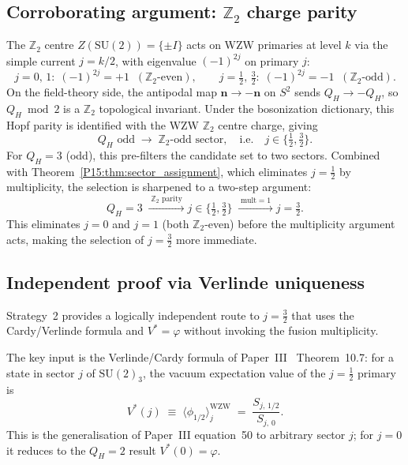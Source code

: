 \documentclass[11pt,a4paper]{article}
\theoremstyle{definition}\newtheorem{definition}[theorem]{Definition}
\theoremstyle{remark}
\newcommand{\vp}{\varphi}
\newcommand{\QH}{Q_H}
\begin{document}
\subsection{Corroborating argument: $\mathbb{Z}_2$ charge parity}
\label{P15:sec:z2_parity}

The $\mathbb{Z}_2$ centre $Z(\mathrm{SU}(2))=\{\pm I\}$ acts on
WZW primaries at level $k$ via the simple current $j=k/2$,
with eigenvalue $(-1)^{2j}$ on primary $j$:
\begin{equation}
  j=0,\,1:\; (-1)^{2j}=+1\;\;(\mathbb{Z}_2\text{-even}),
  \qquad
  j=\tfrac12,\,\tfrac32:\; (-1)^{2j}=-1\;\;(\mathbb{Z}_2\text{-odd}).
  \label{P15:eq:z2_eigenvalues}
\end{equation}
On the field-theory side, the antipodal map $\mathbf{n}\to-\mathbf{n}$
on $S^2$ sends $\QH\to-\QH$, so $\QH\bmod 2$ is a
$\mathbb{Z}_2$ topological invariant.
Under the bosonization dictionary, this Hopf parity is identified
with the WZW $\mathbb{Z}_2$ centre charge, giving
\begin{equation}
  \QH\text{ odd}\;\longrightarrow\;\mathbb{Z}_2\text{-odd sector},
  \quad\text{i.e.}\quad j\in\bigl\{\tfrac12,\tfrac32\bigr\}.
  \label{P15:eq:z2_filter}
\end{equation}
For $\QH=3$ (odd), this pre-filters the candidate set to two
sectors.
Combined with Theorem~\ref{P15:thm:sector_assignment}, which
eliminates $j=\frac12$ by multiplicity, the selection is
sharpened to a two-step argument:
\begin{equation}
  \QH=3\;\xrightarrow{\;\mathbb{Z}_2\text{ parity}\;}
  j\in\bigl\{\tfrac12,\tfrac32\bigr\}
  \;\xrightarrow{\;\mathrm{mult}=1\;}
  j=\tfrac32.
  \label{P15:eq:two_step}
\end{equation}
This eliminates $j=0$ and $j=1$ (both $\mathbb{Z}_2$-even)
before the multiplicity argument acts, making the selection of
$j=\frac32$ more immediate.

\subsection{Independent proof via Verlinde uniqueness}
\label{P15:sec:verlinde_unique}

Strategy~2 provides a logically independent route to
$j=\frac32$ that uses the Cardy/Verlinde formula and
$V^*=\vp$ without invoking the fusion multiplicity.

The key input is the Verlinde/Cardy formula of Paper~III~\cite{Paper3} Theorem~10.7:
for a state in sector $j$ of $\mathrm{SU}(2)_3$, the
vacuum expectation value of the $j=\frac12$ primary is
\begin{equation}
  V^*(j) \;\equiv\;
  \bigl\langle\phi_{1/2}\bigr\rangle_j^{\!\mathrm{WZW}}
  \;=\; \frac{S_{j,\,1/2}}{S_{j,\,0}}.
  \label{P15:eq:verlinde_ratio_general}
\end{equation}
This is the generalisation of Paper~III equation~50
to arbitrary sector $j$; for $j=0$ it reduces to the
$\QH=2$ result $V^*(0)=\vp$.
\end{document}
